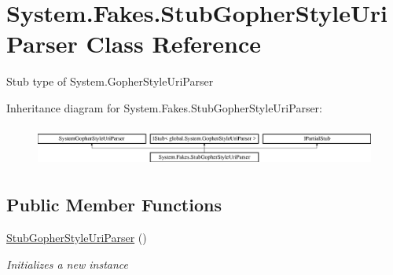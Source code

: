 \hypertarget{class_system_1_1_fakes_1_1_stub_gopher_style_uri_parser}{\section{System.\-Fakes.\-Stub\-Gopher\-Style\-Uri\-Parser Class Reference}
\label{class_system_1_1_fakes_1_1_stub_gopher_style_uri_parser}
}


Stub type of System.\-Gopher\-Style\-Uri\-Parser 


Inheritance diagram for System.\-Fakes.\-Stub\-Gopher\-Style\-Uri\-Parser\-:\begin{figure}[H]
\begin{center}
\leavevmode
\includegraphics[height=1.342926cm]{class_system_1_1_fakes_1_1_stub_gopher_style_uri_parser}
\end{center}
\end{figure}
\subsection*{Public Member Functions}
\begin{DoxyCompactItemize}
\item 
\hyperlink{class_system_1_1_fakes_1_1_stub_gopher_style_uri_parser_af3e00af3238036a5182657d0935c2855}{Stub\-Gopher\-Style\-Uri\-Parser} ()
\begin{DoxyCompactList}\small\item\em Initializes a new instance\end{DoxyCompactList}\end{DoxyCompactItemize}
